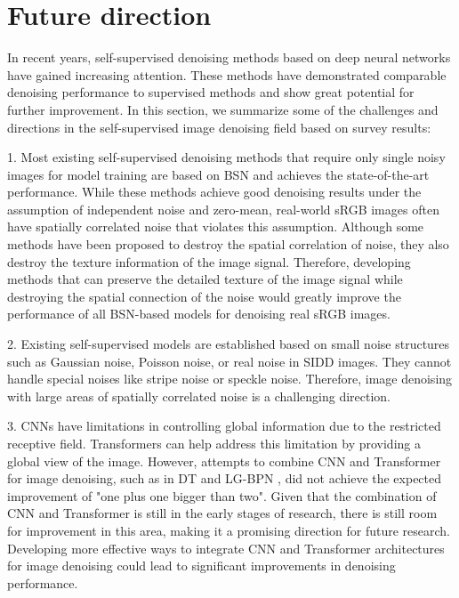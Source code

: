 \documentclass[conference]{IEEEtran}
\begin{document}
\section{Future direction}
\label{sec:Section5}
In recent years, self-supervised denoising methods based on deep neural networks have gained increasing attention. These methods have demonstrated comparable denoising performance to supervised methods and show great potential for further improvement. In this section, we summarize some of the challenges and directions in the self-supervised image denoising field based on survey results:

1.	Most existing self-supervised denoising methods that require only single noisy images for model training are based on BSN and achieves the state-of-the-art performance. While these methods achieve good denoising results under the assumption of independent noise and zero-mean, real-world sRGB images often have spatially correlated noise that violates this assumption. Although some methods \cite{lee2022ap, zhang2023mm, wang2023lg} have been proposed to destroy the spatial correlation of noise, they also destroy the texture information of the image signal. Therefore, developing methods that can preserve the detailed texture of the image signal while destroying the spatial connection of the noise would greatly improve the performance of all BSN-based models for denoising real sRGB images.

2.	Existing self-supervised models are established based on small noise structures such as Gaussian noise, Poisson noise, or real noise in SIDD images. They cannot handle special noises like stripe noise or speckle noise. Therefore, image denoising with large areas of spatially correlated noise is a challenging direction.

3.	CNNs have limitations in controlling global information due to the restricted receptive field. Transformers can help address this limitation by providing a global view of the image. However, attempts to combine CNN and Transformer for image denoising, such as in DT \cite{zhang2023self} and LG-BPN \cite{wang2023lg}, did not achieve the expected improvement of "one plus one bigger than two". Given that the combination of CNN and Transformer is still in the early stages of research, there is still room for improvement in this area, making it a promising direction for future research. Developing more effective ways to integrate CNN and Transformer architectures for image denoising could lead to significant improvements in denoising performance.
\end{document}
